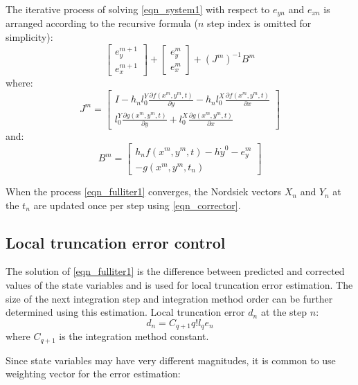 \documentclass[lettersize,journal]{IEEEtran}
\begin{document}
The iterative process of solving \eqref{eqn_system1} with respect to \(e_{yn}\) and \(e_{xn}\) is arranged according to the recursive formula (\(n\) step index is omitted for simplicity):
\begin{equation}
	\label{eqn_fulliter1}
	\begin{bmatrix}
		e_{y}^{m+1} \\
		e_{x}^{m+1} 
	\end{bmatrix}
	+ 
	\begin{bmatrix}
		e_{y}^m \\
		e_{x}^m 
	\end{bmatrix}
	+ (J^{m})^{-1}B^m
\end{equation}
\noindent where:
\begin{equation}
	J^m = \begin{bmatrix}
		I - h_nl_0^Y\frac{\partial f(x^m, y^m, t)}{\partial y}  -  h_nl_0^X\frac{\partial f(x^m, y^m, t)}{\partial x} \\
		l_0^Y\frac{\partial g(x^m, y^m, t)}{\partial y} +  l_0^X\frac{\partial g(x^m, y^m, t)}{\partial x} 
	\end{bmatrix}
\end{equation}
\noindent and:
\begin{equation}
	B^m = 
	\begin{bmatrix}
		h_nf(x^m, y^m, t) - h \dot{y}^0 - e_y^m \\
		-g(x^m, y^m, t_n) 
	\end{bmatrix}
\end{equation}

When the process \eqref{eqn_fulliter1} converges, the Nordsiek vectors \(X_n\) and \(Y_n\) at the \(t_n\) are updated once per step using \eqref{eqn_corrector}.

\subsection{Local truncation error control}
The solution of \eqref{eqn_fulliter1} is the difference between predicted and corrected values of the state variables and is used for local truncation error estimation. The size of the next integration step and integration method order can be further determined using this estimation. Local truncation error \(d_n\) at the step \(n\):
\begin{equation}
	d_n=C_{q+1}q!l_qe_n
\end{equation}
\noindent where \(C_{q+1}\) is the integration method constant.

Since state variables may have very different magnitudes, it is common to use weighting vector for the error estimation:
\end{document}
